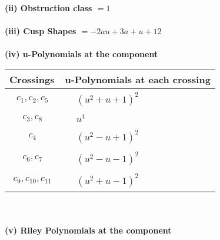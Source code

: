 \documentclass[1p]{elsarticle_modified}
\theoremstyle{definition}
\begin{document}
\flushleft \textbf{(ii) Obstruction class $= 1$}\\~\\
\flushleft \textbf{(iii) Cusp Shapes $= -2 a u+3 a+u+12$}\\~\\
\newpage\renewcommand{\arraystretch}{1}
\flushleft \textbf{(iv) u-Polynomials at the component}\newline \\
\begin{tabular}{m{50pt}|m{274pt}}
Crossings & \hspace{64pt}u-Polynomials at each crossing \\
\hline $$\begin{aligned}c_{1},c_{2},c_{5}\end{aligned}$$&$\begin{aligned}
&(u^2+u+1)^2
\end{aligned}$\\
\hline $$\begin{aligned}c_{3},c_{8}\end{aligned}$$&$\begin{aligned}
&u^4
\end{aligned}$\\
\hline $$\begin{aligned}c_{4}\end{aligned}$$&$\begin{aligned}
&(u^2- u+1)^2
\end{aligned}$\\
\hline $$\begin{aligned}c_{6},c_{7}\end{aligned}$$&$\begin{aligned}
&(u^2- u-1)^2
\end{aligned}$\\
\hline $$\begin{aligned}c_{9},c_{10},c_{11}\end{aligned}$$&$\begin{aligned}
&(u^2+u-1)^2
\end{aligned}$\\
\hline
\end{tabular}\\~\\
\newpage\renewcommand{\arraystretch}{1}
\flushleft \textbf{(v) Riley Polynomials at the component}\newline \\
\end{document}
